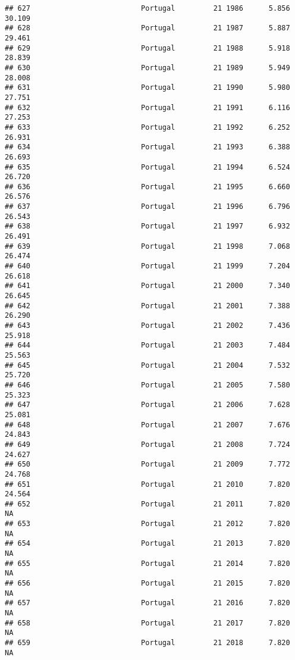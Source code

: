 \documentclass[
]{article}
\begin{document}
\begin{verbatim}
## 627                          Portugal         21 1986      5.856     30.109
## 628                          Portugal         21 1987      5.887     29.461
## 629                          Portugal         21 1988      5.918     28.839
## 630                          Portugal         21 1989      5.949     28.008
## 631                          Portugal         21 1990      5.980     27.751
## 632                          Portugal         21 1991      6.116     27.253
## 633                          Portugal         21 1992      6.252     26.931
## 634                          Portugal         21 1993      6.388     26.693
## 635                          Portugal         21 1994      6.524     26.720
## 636                          Portugal         21 1995      6.660     26.576
## 637                          Portugal         21 1996      6.796     26.543
## 638                          Portugal         21 1997      6.932     26.491
## 639                          Portugal         21 1998      7.068     26.474
## 640                          Portugal         21 1999      7.204     26.618
## 641                          Portugal         21 2000      7.340     26.645
## 642                          Portugal         21 2001      7.388     26.290
## 643                          Portugal         21 2002      7.436     25.918
## 644                          Portugal         21 2003      7.484     25.563
## 645                          Portugal         21 2004      7.532     25.720
## 646                          Portugal         21 2005      7.580     25.323
## 647                          Portugal         21 2006      7.628     25.081
## 648                          Portugal         21 2007      7.676     24.843
## 649                          Portugal         21 2008      7.724     24.627
## 650                          Portugal         21 2009      7.772     24.768
## 651                          Portugal         21 2010      7.820     24.564
## 652                          Portugal         21 2011      7.820         NA
## 653                          Portugal         21 2012      7.820         NA
## 654                          Portugal         21 2013      7.820         NA
## 655                          Portugal         21 2014      7.820         NA
## 656                          Portugal         21 2015      7.820         NA
## 657                          Portugal         21 2016      7.820         NA
## 658                          Portugal         21 2017      7.820         NA
## 659                          Portugal         21 2018      7.820         NA

\end{verbatim}
\end{document}
